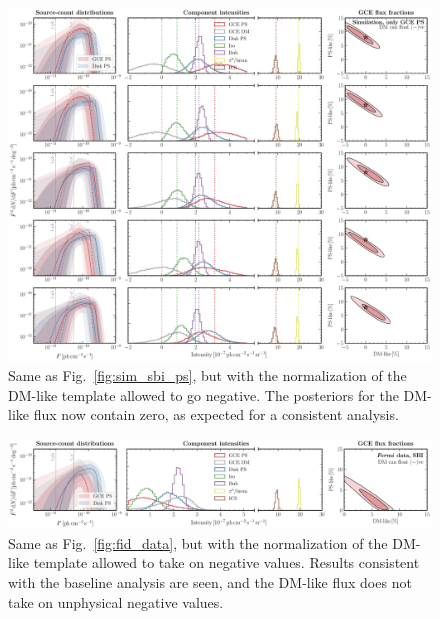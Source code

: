 \documentclass[prd,aps,10pt,nofootinbib,twocolumn,superscriptaddress,preprintnumbers,balancelastpage,longbibliography,floatfix]{revtex4-2}
\begin{document}
%
\begin{figure}[!htbp]
\centering
\includegraphics[width=1.\textwidth]{sim_sbi_ps_neg.pdf}
\caption{Same as Fig.~\ref{fig:sim_sbi_ps}, but with the normalization of the DM-like template allowed to go negative. The posteriors for the DM-like flux now contain zero, as expected for a consistent analysis.}
\label{fig:sim_sbi_ps_neg}
\end{figure}
%

%
\begin{figure}[!htbp]
\centering
\includegraphics[width=1.\textwidth]{fermi_sbi_neg_dm.pdf}
\caption{Same as Fig.~\ref{fig:fid_data}, but with the normalization of the DM-like template allowed to take on negative values. Results consistent with the baseline analysis are seen, and the DM-like flux does not take on unphysical negative values.}
\label{fig:fermi_sbi_neg}
\end{figure}
%


\clearpage



\end{document}
